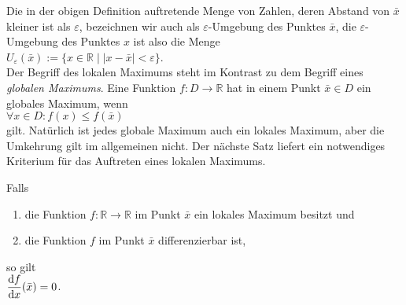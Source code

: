 Die in der obigen Definition auftretende Menge von Zahlen, deren Abstand von $\bar{x}$
kleiner ist als $\varepsilon$, bezeichnen wir auch als $\varepsilon$-Umgebung des Punktes
$\bar{x}$, die $\varepsilon$-Umgebung des Punktes $x$ ist also die Menge 
\\[0.2cm]
\hspace*{1.3cm} $U_\varepsilon(\bar{x}) := \bigl\{ x \in \mathbb{R} \;\big|\; |x - \bar{x}| < \varepsilon \bigr\}$.
\\[0.2cm]
Der Begriff des lokalen Maximums steht im Kontrast zu dem Begriff eines \emph{globalen Maximums}.
Eine Funktion $f:D \rightarrow \mathbb{R}$ hat in einem Punkt $\bar{x} \in D$ ein globales
Maximum, wenn
\\[0.2cm]
\hspace*{1.3cm}
$\forall x \in D: f(x) \leq f(\bar{x})$
\\[0.2cm]
gilt.  Nat\"urlich ist jedes globale Maximum auch ein lokales Maximum, aber die Umkehrung
gilt im allgemeinen nicht.  Der n\"achste Satz liefert ein notwendiges Kriterium f\"ur das
Auftreten eines lokalen Maximums.

\begin{Satz} 
Falls
\begin{enumerate}
\item die Funktion $f: \mathbb{R} \rightarrow \mathbb{R}$ im Punkt $\bar{x}$ ein lokales Maximum besitzt und 
\item die Funktion $f$ im Punkt $\bar{x}$ differenzierbar ist,
\end{enumerate} 
so gilt 
\\[0.3cm]
\hspace*{1.3cm}
$\displaystyle\frac{\textrm{d}f}{\textrm{d}x}(\bar{x}) = 0$.
\end{Satz}

